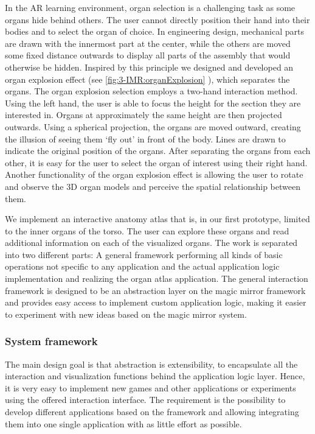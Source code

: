 In the AR learning environment, organ selection is a challenging task as some organs hide behind others. The user cannot directly position their hand into their bodies and to select the organ of choice. In engineering design, mechanical parts are drawn with the innermost part at the center, while the others are moved some fixed distance outwards to display all parts of the assembly that would otherwise be hidden. Inspired by this principle we designed and developed an organ explosion effect (see \figurename{\ref{fig:3-IMR:organExplosion}} ), which separates the organs. The organ explosion selection employs a two-hand interaction method. Using the left hand, the user is able to focus the height for the section they are interested in. Organs at approximately the same height are then projected outwards. Using a spherical projection, the organs are moved outward, creating the illusion of seeing them `fly out' in front of the body. Lines are drawn to indicate the original position of the organs. After separating the organs from each other, it is easy for the user to select the organ of interest using their right hand. Another functionality of the organ explosion effect is allowing the user to rotate and observe the 3D organ models and perceive the spatial relationship between them.

We implement an interactive anatomy atlas that is, in our first prototype, limited to the inner organs of the torso. The user can explore these organs and read additional information on each of the visualized organs. The work is separated into two different parts: A general framework performing all kinds of basic operations not specific to any application and the actual application logic implementation and realizing the organ atlas application.
The general interaction framework is designed to be an abstraction layer on the magic mirror framework and provides easy access to implement custom application logic, making it easier to experiment with new ideas based on the magic mirror system.

\subsubsection{System framework}
The main design goal is that abstraction is extensibility, to encapsulate all the interaction and visualization functions behind the application logic layer. Hence,  it is very easy to implement new games and other applications or experiments using the offered interaction interface.
The requirement is the possibility to develop different applications based on the framework and allowing integrating them into one single application with as little effort as possible. 

